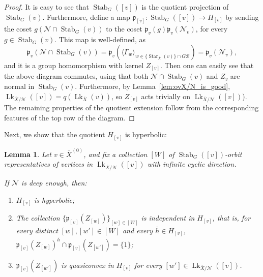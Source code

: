 \documentclass[svgnames]{amsart}
\theoremstyle{plain}
\newtheorem{lemma}[thm]{Lemma}
\theoremstyle{definition}
\newcommand{\ov}[1]{\overline{#1}}
\newcommand{\link}{\operatorname{Lk}}
\newcommand{\Stab}[2]{\operatorname{Stab}_{#1}(#2)}
\newcommand{\N}{\mathcal{N}}
\newcommand{\B}{\mathcal{B}}
\newcommand{\p}{\mathfrak{p}}
\begin{document}
\begin{proof} It is easy to see that $\Stab{G}{[v]}$ is the quotient projection of $\Stab{G}{v}$. Furthermore, define a map $\p_{[v]}\colon\Stab{G}{[v]}\to H_{[v]}$ by sending the coset $g(\N\cap \Stab{G}{v})$ to the coset $\p_v(g)\p_v(\N_v)$, for every $g\in \Stab{G}{v}$. This map is well-defined, as 
$$\p_v(\N\cap \Stab{G}{v})=\p_v\left(\langle \Gamma_w\rangle_{w\in\{\operatorname{Star}_{\ov X}(v)\}\cap G\B}\right)=\p_v(\N_v),$$
and it is a group homomorphism with kernel $Z_{[v]}$. Then one can easily see that the above diagram commutes, using that both $\N\cap\Stab{G}{v}$ and $Z_v$ are normal in $\Stab{G}{v}$. Furthermore, by Lemma~\ref{lem:ovX/N_is_good}, $\link_{\ov X/\N}([v])=q(\link_{\ov X}(v))$, so $Z_{[v]}$ acts trivially on $\link_{\ov X/\N}([v])$). The remaining properties of the quotient extension follow from the corresponding features of the top row of the diagram.
\end{proof}

Next, we show that the quotient $H_{[v]}$ is hyperbolic:

\begin{lemma}\label{lem:Hv/Nv_rel_hyp}
Let $v\in \ov{X}^{(0)}$, and fix a collection $[W]$ of $\Stab{G}{[v]}$-orbit representatives of vertices in $\link_{\ov X/\N}([v])$ with infinite cyclic direction.

If $\N$ is deep enough, then:
\begin{enumerate}
    \item $H_{[v]}$ is hyperbolic;
    \item The collection $\{\p_{[v]}(Z_{[w]})\}_{[w]\in [W]}$ is \emph{independent} in $H_{[v]}$, that is, for every distinct $[w],[w']\in [W]$ and every $\ov h\in H_{[v]}$, $\p_{[v]}(Z_{[w]})^{\ov h} \cap \p_{[v]}(Z_{[w']})=\{1\}$;
    \item $\p_{[v]}(Z_{[w']})$ is quasiconvex in $H_{[v]}$ for every ${[w']\in \link_{\ov X/\N}([v])}$.
\end{enumerate} 
\end{lemma}
\end{document}
